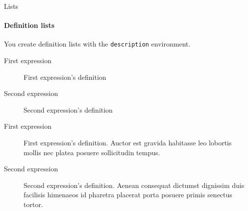 \begin{frame}[c, fragile]{Lists}
	\framesubtitle{Definition lists}
	
	You create definition lists with the \texttt{description} environment.
	
\begin{codesource}
	\begin{description}
		\item[First expression] First expression's definition
		\item[Second expression] Second expression's definition
	\end{description}
\end{codesource}

	\begin{description}
		\item[First expression] First expression's definition. Auctor est gravida habitasse leo lobortis mollis nec platea posuere
		 sollicitudin tempus.
		\item[Second expression] Second expression's definition. Aenean consequat dictumst dignissim duis facilisis himenaeos id
		 pharetra placerat porta posuere primis senectus tortor.
	\end{description}
\end{frame}

